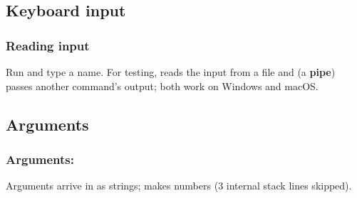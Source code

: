 \documentclass[aspectratio=169,10pt,compress]{beamer}
\begin{document}




\subsection[Input]{Keyboard input}




\begin{frame}[t,fragile] \frametitle{Reading input}

  \vspace{0.2em}
  \small Run  and type a name. For testing, \hCode{<} reads the input from a file and
  \hCode{|} (a \textbf{pipe}) passes another command's output; both work on Windows and macOS.
\end{frame}




\subsection[Args]{Arguments}




\begin{frame}[t,fragile] \frametitle{Arguments: }

  \vspace{0.2em}
  \small Arguments arrive in  as strings;  makes numbers (3 internal stack lines skipped).
\end{frame}




\end{document}
